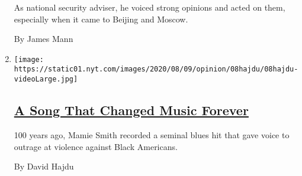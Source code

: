 \begin{enumerate}
  As national security adviser, he voiced strong opinions and acted on
  them, especially when it came to Beijing and Moscow.

  By James Mann
\item
  \texttt{[image: https://static01.nyt.com/images/2020/08/09/opinion/08hajdu/08hajdu-videoLarge.jpg]}

  \hypertarget{a-song-that-changed-music-forever}{%
  \subsection{\texorpdfstring{\href{/2020/08/08/opinion/sunday/crazy-blues-mamie-smith.html}{A
  Song That Changed Music
  Forever}}{A Song That Changed Music Forever}}\label{a-song-that-changed-music-forever}}

  100 years ago, Mamie Smith recorded a seminal blues hit that gave
  voice to outrage at violence against Black Americans.

  By David Hajdu
\end{enumerate}

